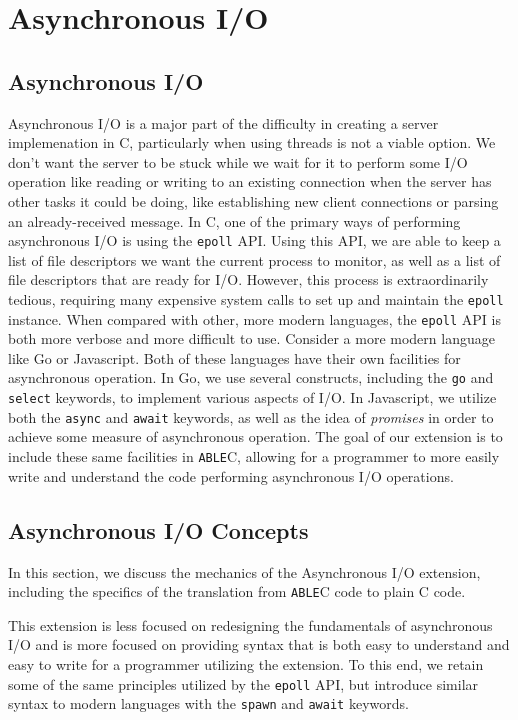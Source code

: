 \documentclass[main.tex]{subfiles}
\begin{document}
\section{Asynchronous I/O}

\subsection{Asynchronous I/O}
Asynchronous I/O is a major part of the difficulty in creating a server
implemenation in C, particularly when using threads is not a viable option. We
don't want the server to be stuck while we wait for it to perform some I/O
operation like reading or writing to an existing connection when the server has
other tasks it could be doing, like establishing new client connections or
parsing an already-received message. In C, one of the primary ways of performing
asynchronous I/O is using the \verb|epoll| API. Using this API, we are able to
keep a list of file descriptors we want the current process to monitor, as well
as a list of file descriptors that are ready for I/O. However, this process is
extraordinarily tedious, requiring many expensive system calls to set up and
maintain the \verb|epoll| instance. When compared with other, more modern
languages, the \verb|epoll| API is both more verbose and more difficult to use.
Consider a more modern language like Go or Javascript. Both of these languages
have their own facilities for asynchronous operation. In Go, we use several
constructs, including the \verb|go| and \verb|select| keywords, to implement
various aspects of I/O. In Javascript, we utilize both the \verb|async| and
\verb|await| keywords, as well as the idea of \emph{promises} in order to
achieve some measure of asynchronous operation. The goal of our extension is to
include these same facilities in \verb|ABLE|C, allowing for a programmer to more
easily write and understand the code performing asynchronous I/O operations.

\subsection{Asynchronous I/O Concepts}
In this section, we discuss the mechanics of the Asynchronous I/O extension, including
the specifics of the translation from \verb|ABLE|C code to plain C code.

This extension is less focused on redesigning the fundamentals of asynchronous I/O and is more focused
on providing syntax that is both easy to understand and easy to write for a programmer utilizing the extension.
To this end, we retain some of the same principles utilized by the \verb|epoll| API, but introduce similar syntax to
modern languages with the \verb|spawn| and \verb|await| keywords.
\end{document}
